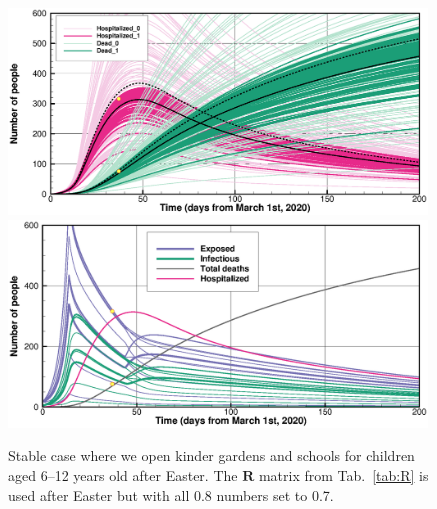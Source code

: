 \documentclass[twoside,11pt]{article}
\newcommand{\bmR}{{\mathbf{R}}}
\begin{document}
\begin{figure}[p]
\begin{center}
\includegraphics[width=0.99\textwidth]{openA07.eps} \\
\includegraphics[width=0.99\textwidth]{openB07.eps}
\end{center}
\caption{Stable case  where we open kinder gardens and schools for children aged 6--12 years old after Easter. 
The $\bmR$ matrix from Tab.~\ref{tab:R} is used after Easter but with all 0.8 numbers set to 0.7.
\label{fig:open07}}
\end{figure}
\end{document}
